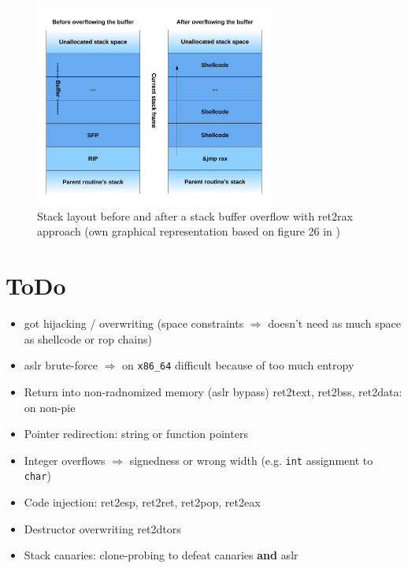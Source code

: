 \begin{figure}[htb]
	\centering
	\includegraphics[width=0.7\textwidth]{figures/ret2rax}
	\caption{Stack layout before and after a stack buffer overflow with ret2rax approach (own graphical representation based on figure 26 in \cite[14]{Mueller2008})}
	\label{fig:ret2rax}
\end{figure}

\section*{ToDo}

\begin{itemize}
	\item{
		\gls{got} hijacking / overwriting (space constraints $\Rightarrow$ doesn't need as much space as shellcode or \gls{rop} chains) \cmark
	}
	\item{
		\gls{aslr} brute-force $\Rightarrow$ on \texttt{x86\_64} difficult because of too much entropy
	}
	\item{
		Return into non-radnomized memory (\gls{aslr} bypass) ret2text, ret2bss, ret2data: on non-\gls{pie}
	}
	\item{
		Pointer redirection: string or function pointers
	}
	\item{
		Integer overflows $\Rightarrow$ signedness or wrong width (e.g. \texttt{int} assignment to \texttt{char})
	}
	\item{
		Code injection: ret2esp, ret2ret, ret2pop, ret2eax
	}
	\item{
		Destructor overwriting ret2dtors
	}
	\item{
		Stack canaries: clone-probing to defeat canaries \textbf{and} \gls{aslr}
	}
\end{itemize}
